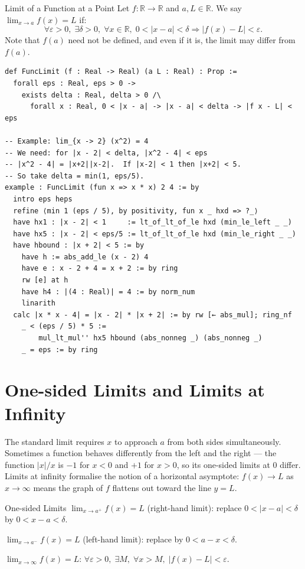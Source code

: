 \documentclass[12pt, openany]{book}
\theoremstyle{plain}
\theoremstyle{definition}
\theoremstyle{remark}
\newcommand{\R}{\mathbb{R}}
\newcommand{\eps}{\varepsilon}
\newcommand{\del}{\delta}
\begin{document}
\begin{defbox}{Limit of a Function at a Point}
Let $f : \R \to \R$ and $a, L \in \R$. We say $\lim_{x \to a} f(x) = L$ if:
\[ \forall \eps > 0,\; \exists \del > 0,\; \forall x \in \R,\; 0 < |x - a| < \del \Rightarrow |f(x) - L| < \eps. \]
Note that $f(a)$ need not be defined, and even if it is, the limit may differ from $f(a)$.
\end{defbox}
\color{black}

\begin{leanbox}
\begin{lstlisting}
def FuncLimit (f : Real -> Real) (a L : Real) : Prop :=
  forall eps : Real, eps > 0 ->
    exists delta : Real, delta > 0 /\
      forall x : Real, 0 < |x - a| -> |x - a| < delta -> |f x - L| < eps

-- Example: lim_{x -> 2} (x^2) = 4
-- We need: for |x - 2| < delta, |x^2 - 4| < eps
-- |x^2 - 4| = |x+2||x-2|.  If |x-2| < 1 then |x+2| < 5.
-- So take delta = min(1, eps/5).
example : FuncLimit (fun x => x * x) 2 4 := by
  intro eps heps
  refine ⟨min 1 (eps / 5), by positivity, fun x _ hxd => ?_⟩
  have hx1 : |x - 2| < 1     := lt_of_lt_of_le hxd (min_le_left _ _)
  have hx5 : |x - 2| < eps/5 := lt_of_lt_of_le hxd (min_le_right _ _)
  have hbound : |x + 2| < 5 := by
    have h := abs_add_le (x - 2) 4
    have e : x - 2 + 4 = x + 2 := by ring
    rw [e] at h
    have h4 : |(4 : Real)| = 4 := by norm_num
    linarith
  calc |x * x - 4| = |x - 2| * |x + 2| := by rw [← abs_mul]; ring_nf
    _ < (eps / 5) * 5 :=
        mul_lt_mul'' hx5 hbound (abs_nonneg _) (abs_nonneg _)
    _ = eps := by ring
\end{lstlisting}
\end{leanbox}
\color{black}

\section{One-sided Limits and Limits at Infinity}

The standard limit requires $x$ to approach $a$ from both sides simultaneously.  Sometimes a function behaves differently from the left and the right --- the function $|x|/x$ is $-1$ for $x < 0$ and $+1$ for $x > 0$, so its one-sided limits at $0$ differ.  Limits at infinity formalise the notion of a horizontal asymptote: $f(x) \to L$ as $x \to \infty$ means the graph of $f$ flattens out toward the line $y = L$.

\begin{defbox}{One-sided Limits}
$\lim_{x \to a^+} f(x) = L$ (right-hand limit): replace $0 < |x-a| < \del$ by $0 < x - a < \del$.

$\lim_{x \to a^-} f(x) = L$ (left-hand limit): replace by $0 < a - x < \del$.

$\lim_{x \to \infty} f(x) = L$: $\forall \eps > 0,\; \exists M,\; \forall x > M,\; |f(x) - L| < \eps$.
\end{defbox}
\color{black}
\end{document}
